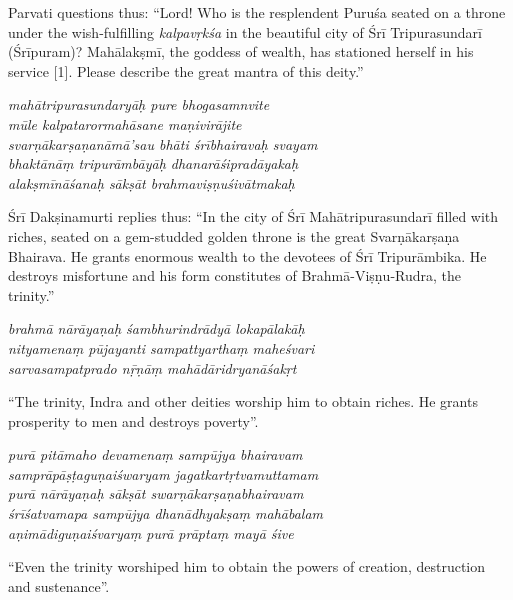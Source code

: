 \documentclass[12pt,oneside,a4paper]{article}
\newenvironment{shloka}[1]
  {\bigskip\center#1\varwidth{\linewidth}}
  {\endvarwidth\endcenter\bigskip}
\newcommand{\tl}[1]{\emph{#1}}
\begin{document}
Parvati questions thus: ``Lord! Who is the resplendent Puruśa seated on
a throne under the wish-fulfilling \tl{kalpavṛkśa} in the beautiful city of
Śrī Tripurasundarī (Śrīpuram)? Mahālakṣmī, the goddess of wealth, has stationed
herself in his service [1]. Please describe the great mantra of this deity.''

\begin{shloka}\itshape
  mahātripurasundaryāḥ pure bhogasamnvite \\
  mūle kalpatarormahāsane maṇivirājite \\
  svarṇākarṣaṇanāmā'sau bhāti śrībhairavaḥ svayam \\
  bhaktānāṃ tripurāmbāyāḥ dhanarāśipradāyakaḥ \\
  alakṣmīnāśanaḥ sākṣāt brahmaviṣṇuśivātmakaḥ
\end{shloka}

Śrī Dakṣinamurti replies thus: ``In the city of Śrī Mahātripurasundarī filled
with riches, seated on a gem-studded golden throne is the great Svarṇākarṣaṇa
Bhairava. He grants enormous wealth to the devotees of Śrī Tripurāmbika.
He destroys misfortune and his form constitutes of Brahmā-Viṣṇu-Rudra,
the trinity.''

\begin{shloka}\itshape
  brahmā nārāyaṇaḥ śambhurindrādyā lokapālakāḥ \\
  nityamenaṃ pūjayanti sampattyarthaṃ maheśvari \\
  sarvasampatprado nṝṇāṃ mahādāridryanāśakṛt
\end{shloka}

``The trinity, Indra and other deities worship him to obtain riches. He grants
prosperity to men and destroys poverty''.

\begin{shloka}\itshape
  purā pitāmaho devamenaṃ sampūjya bhairavam \\
  samprāpāṣṭaguṇaiśwaryam jagatkartṛtvamuttamam \\
  purā nārāyaṇaḥ sākṣāt swarṇākarṣaṇabhairavam \\
  śrīśatvamapa sampūjya dhanādhyakṣaṃ mahābalam \\
  aṇimādiguṇaiśvaryaṃ purā prāptaṃ mayā śive
\end{shloka}

``Even the trinity worshiped him to obtain the powers of creation, destruction
and sustenance''.
\end{document}
